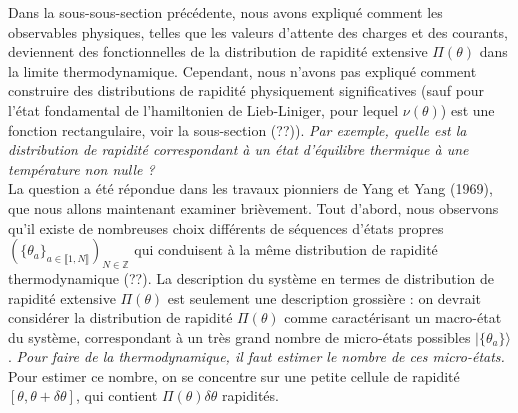 Dans la sous-sous-section précédente, nous avons expliqué comment les observables physiques, telles que les valeurs d'attente des charges et des courants, deviennent des fonctionnelles de la distribution de rapidité extensive $\Pi(\theta)$ dans la limite thermodynamique. Cependant, nous n'avons pas expliqué comment construire des distributions de rapidité physiquement significatives (sauf pour l'état fondamental de l'hamiltonien de Lieb-Liniger, pour lequel $\nu(\theta)$) est une fonction rectangulaire, voir la sous-section (??)). {\em Par exemple, quelle est la distribution de rapidité correspondant à un état d'équilibre thermique à une température non nulle ?}\\
	
	La question a été répondue dans les travaux pionniers de Yang et Yang (1969), que nous allons maintenant examiner brièvement. Tout d'abord, nous observons qu'il existe de nombreuses choix différents de séquences d'états propres $(\{\theta_a\}_{ a \in \llbracket 1 , N \rrbracket} )_{ N \in \mathbb{Z}}$ qui conduisent à la même distribution de rapidité thermodynamique (??). La description du système en termes de distribution de rapidité extensive $\Pi( \theta ) $ est seulement une description grossière : on devrait considérer la distribution de rapidité $\Pi ( \theta ) $ comme caractérisant un macro-état du système, correspondant à un très grand nombre de micro-états possibles $\vert \{ \theta_a \} \rangle $. {\em Pour faire de la thermodynamique, il faut estimer le nombre de ces micro-états.}\\
	
	Pour estimer ce nombre, on se concentre sur une petite cellule de rapidité $[\theta, \theta+\delta\theta]$, qui contient $\Pi(\theta) \delta \theta$ rapidités. 
	
	\begin{figure}[H]
		\centering 
		\captionsetup{skip=10pt} %
	\end{figure}
	

